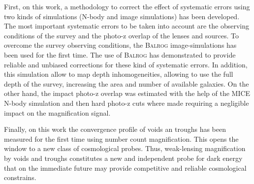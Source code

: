 First, on this work, a methodology to correct the effect of systematic errors using two kinds of simulations (N-body and image simulations) has been developed. The most important systematic errors to be taken into account are the observing conditions of the survey and the photo-z overlap of the lenses and sources. To overcome the survey observing conditions, the {\scshape Balrog} image-simulations has been used for the first time. The use of {\scshape Balrog} has demonstrated to provide reliable and unbiased corrections for these kind of systematic errors. In addition, this simulation allow to map depth inhomogeneities, allowing to use the full depth of the survey, increasing the area and number of available galaxies. On the other hand, the impact photo-z overlap was estimated with the help of the MICE N-body simulation and then hard photo-z cuts where made requiring a negligible impact on the magnification signal.
\newline

Finally, on this work the convergence profile of voids an troughs has been measured for the first time using number count magnification. This opens the window to a new class of cosmological probes. Thus, weak-lensing magnification by voids and troughs constitutes a new and independent probe for dark energy that on the immediate future may provide competitive and reliable cosmological constrains.

